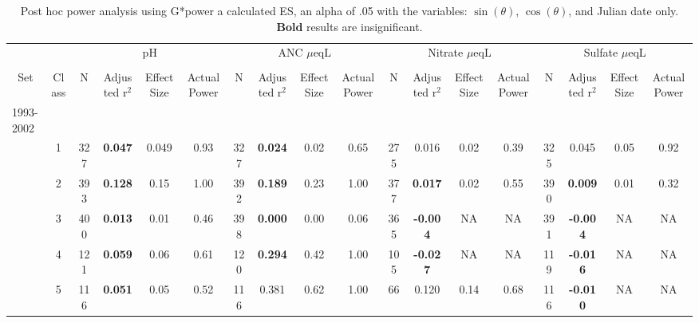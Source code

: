 \begin{sidewaystable}[p]\footnotesize
\caption{Post hoc power analysis using G*power a calculated ES, an alpha of .05 with the variables: $\sin(\theta)$, $\cos(\theta)$, and Julian date only.   \textbf{Bold} results are insignificant.}
\begin{tabular}{p{1cm}p{.5cm}cccccccccccccccc}
\hline\noalign{\smallskip}
\multicolumn{1}{c}{}&\multicolumn{1}{c}{}  & \multicolumn{4}{c}{pH} &\multicolumn{4}{c}{ ANC $\mu$eqL} & \multicolumn{4}{c}{ Nitrate $\mu$eqL} &  \multicolumn{4}{c}{Sulfate $\mu$eqL}  \\ \cline{3-18}\noalign{\smallskip}
 & \multicolumn{ 1}{c}{} & \multicolumn{ 1}{c}{} &  \\ 
 \multicolumn{ 1}{c}{Set} & \multicolumn{ 1}{c}{Class} & \multicolumn{ 1}{c}{N} & \multicolumn{ 1}{p{1.2cm}}{Adjusted r$^2$} & \multicolumn{ 1}{p{1cm}}{Effect Size} & \multicolumn{ 1}{p{1cm}}{Actual Power} & \multicolumn{ 1}{c}{N} & \multicolumn{ 1}{p{1.2cm}}{Adjusted r$^2$} & \multicolumn{ 1}{p{1cm}}{Effect Size} & \multicolumn{ 1}{p{1cm}}{Actual Power} & \multicolumn{ 1}{c}{N} & \multicolumn{ 1}{p{1.2cm}}{Adjusted r$^2$} & \multicolumn{ 1}{p{1cm}}{Effect Size} & \multicolumn{ 1}{p{1cm}}{Actual Power} & \multicolumn{ 1}{c}{N} & \multicolumn{ 1}{p{1.2cm}}{Adjusted r$^2$} & \multicolumn{ 1}{p{1cm}}{Effect Size}& \multicolumn{1}{p{1cm}}{Actual Power} \\ \hline\noalign{\smallskip}
1993-2002\\
& \multicolumn{1}{c}{1} & 327 & \textbf{0.047} & 0.049 & 0.93 & 327 & \textbf{0.024} & 0.02 & 0.65 & 275 & 0.016 & 0.02 & 0.39 & 325 & 0.045 & 0.05 & 0.92 \\ 
 & \multicolumn{ 1}{c}{2} & 393 & \textbf{0.128 } & 0.15  & 1.00  & 392 & \textbf{0.189 } & 0.23  & 1.00  & 377 & \textbf{0.017 } & 0.02  & 0.55  & 390 & \textbf{0.009 } & 0.01  & 0.32  \\ 
 & \multicolumn{ 1}{c}{3} & 400 & \textbf{0.013 } & 0.01  & 0.46  & 398 & \textbf{0.000 } & 0.00  & 0.06  & 365 & \textbf{-0.004 } & NA & NA & 391 & \textbf{-0.004 } &  NA & NA \\ 
 & \multicolumn{ 1}{c}{4} & 121 & \textbf{0.059 } & 0.06  & 0.61  & 120 & \textbf{0.294 } & 0.42  & 1.00  & 105 & \textbf{-0.027 } & NA & NA & 119 & \textbf{-0.016 } & NA & NA \\ 
 & \multicolumn{ 1}{c}{5} & 116 & \textbf{0.051 } & 0.05  & 0.52  & 116 & 0.381  & 0.62  & 1.00  & 66 & 0.120  & 0.14  & 0.68  & 116 & \textbf{-0.010 } & NA & NA \\ 

\end{tabular}
\end{sidewaystable}
